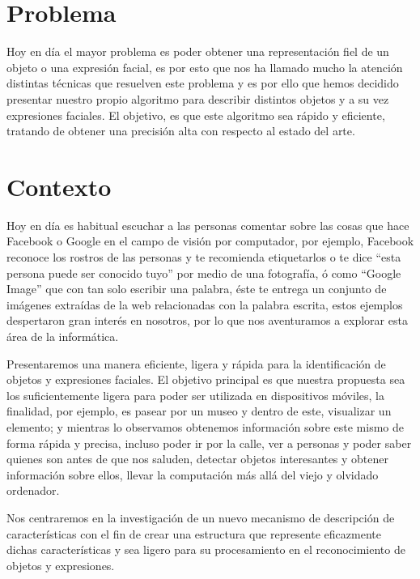\section{Problema}\label{sec:problema}
Hoy en día el mayor problema es poder obtener una representación fiel de un objeto o una expresión facial, es por esto que nos ha llamado mucho la atención distintas técnicas que resuelven este problema y es por ello que hemos decidido presentar nuestro propio algoritmo para describir distintos objetos y a su vez expresiones faciales. El objetivo, es que este algoritmo sea rápido y eficiente, tratando de obtener una precisión alta con respecto al estado del arte.

\section{Contexto}\label{sub:Contexto}

Hoy en día es habitual escuchar a las personas comentar sobre las cosas que hace Facebook o Google en el campo de visión por computador, por ejemplo, Facebook reconoce los rostros de las personas y te recomienda etiquetarlos o te dice ``esta persona puede ser conocido tuyo'' por medio de una fotografía, ó como ``Google Image'' que con tan solo escribir una palabra, éste te entrega un conjunto de imágenes extraídas de la web relacionadas con la palabra escrita, estos ejemplos despertaron gran interés en nosotros, por lo que nos aventuramos a explorar esta área de la informática.

Presentaremos una manera eficiente, ligera y rápida para la identificación de objetos y expresiones faciales. El objetivo principal es que nuestra propuesta sea los suficientemente ligera para poder ser utilizada en dispositivos móviles, la finalidad, por ejemplo, es pasear por un museo y dentro de este, visualizar un elemento; y mientras lo observamos obtenemos información sobre este mismo de forma rápida y precisa, incluso poder ir por la calle, ver a personas y poder saber quienes son antes de que nos saluden, detectar objetos interesantes y obtener información sobre ellos, llevar la computación más allá del viejo y olvidado ordenador.

Nos centraremos en la investigación de un nuevo mecanismo de descripción de características con el fin de crear una estructura que represente eficazmente dichas características y sea ligero para su procesamiento en el reconocimiento de objetos y expresiones.


